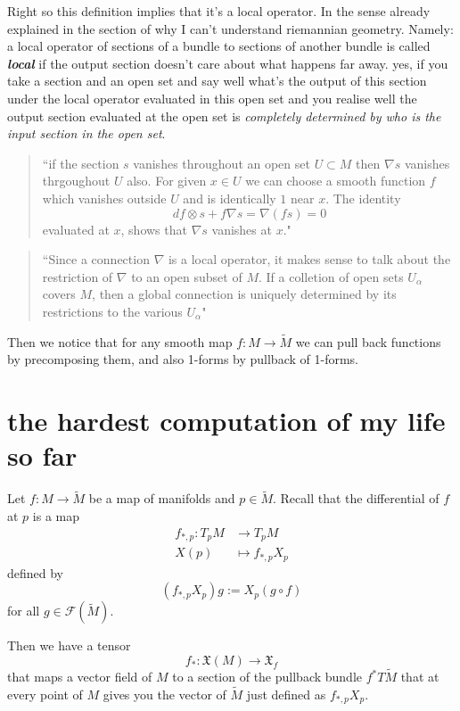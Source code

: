 Right so this definition implies that it's a local operator. In the sense already explained in the section of why I can't understand riemannian geometry. Namely: a local operator of sections of a bundle to sections of another bundle is called \textit{\textbf{local}} if the output section doesn't care about what happens far away. yes, if you take a section and an open set and say well what's the output of this section under the local operator evaluated in this open set and you realise well the output section evaluated at the open set is \textit{completely determined by who is the input section in the open set}.

\begin{quotation}
	``if the section \(s\) vanishes throughout an open set \(U \subset M\) then \(\nabla s\) vanishes thrgoughout \(U\) also. For given \(x \in U\) we can choose a smooth function \(f\) which vanishes outside \(U\) and is identically \(1\) near \(x\). The identity
	\[df \otimes s+ f \nabla s=\nabla(fs)=0\]
evaluated at \(x\), shows that \(\nabla s\) vanishes at \(x\)."	
\end{quotation}
\begin{quotation}
	``Since a connection \(\nabla\) is a local operator, it makes sense to talk about the restriction of \(\nabla\) to an open subset of \(M\). If a colletion of open sets \(U_\alpha\) covers \(M\), then a global connection is uniquely determined by its restrictions to the various \(U_\alpha\)"
\end{quotation}


Then we notice that for any smooth map \(f:M \to \widetilde{M}\) we can pull back functions by precomposing them, and also 1-forms by pullback of 1-forms.

\section{the hardest computation of my life so far}
Let \(f:M \to \tilde{M}\) be a map of manifolds and \(p \in \tilde{M}\).  Recall that the differential of \(f\) at \(p\) is a map
\begin{align*}
	f_{*,p}: T_pM &\longrightarrow T_pM \\
	X(p) &\longmapsto f_{*,p}X_p
\end{align*}
defined by
\[(f_{*,p}X_p)g:=X_p(g \circ f)\]
for all \(g \in \mathcal{F}(\tilde{M})\).

Then we have a tensor
\[f_*:\mathfrak{X}(M) \longrightarrow \mathfrak{X}_f\]
that maps a vector field of \(M\) to a section of the pullback bundle \(f^*T\tilde{M}\) that at every point  of \(M\) gives you the vector of \(\tilde{M}\) just defined as \(f_{*,p}X_p\).

